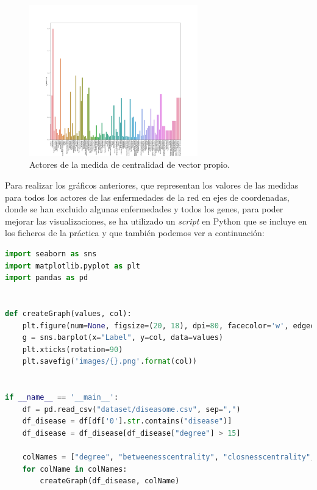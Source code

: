 \documentclass{uimppracticas}
\begin{document}
\begin{figure}[H]
	\centering
	\includegraphics[width=0.65\textwidth]{images/eigencentrality}
	\caption{Actores de la medida de centralidad de vector propio.}
	\label{eigencentrality}
\end{figure}

Para realizar los gráficos anteriores, que representan los valores de las medidas para todos los actores de las enfermedades de la red en ejes de coordenadas, donde se han excluido algunas enfermedades y todos los genes, para poder mejorar las visualizaciones, se ha utilizado un \textit{script} en Python que se incluye en los ficheros de la práctica y que también podemos ver a continuación:

\begin{lstlisting}[language=Python, basicstyle=\small]
import seaborn as sns
import matplotlib.pyplot as plt
import pandas as pd


def createGraph(values, col):
	plt.figure(num=None, figsize=(20, 18), dpi=80, facecolor='w', edgecolor='r')
	g = sns.barplot(x="Label", y=col, data=values)
	plt.xticks(rotation=90)
	plt.savefig('images/{}.png'.format(col))


if __name__ == '__main__':
	df = pd.read_csv("dataset/diseasome.csv", sep=",")
	df_disease = df[df['0'].str.contains("disease")]
	df_disease = df_disease[df_disease["degree"] > 15]
	
	colNames = ["degree", "betweenesscentrality", "closnesscentrality", "eigencentrality"]
	for colName in colNames:
		createGraph(df_disease, colName)
\end{lstlisting}

\newpage

\renewcommand{\refname}{Bibliografía}


\end{document}
